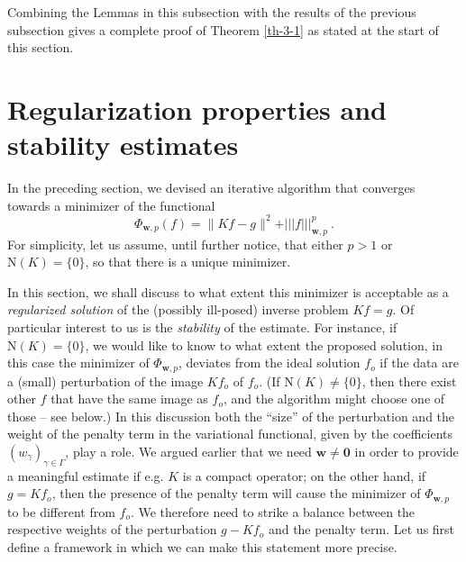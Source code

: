 \documentclass[10pt]{article}
\def\mN{\mbox{N}}
\def\ag{w_{\gamma}}
\def\g{\gamma}
\def\Vvert{\vert\!\vert\!\vert}
\begin{document}
\bigskip

Combining the Lemmas in this subsection with the results of the previous
subsection gives a complete proof of Theorem \ref{th-3-1} as stated at the
start of this section.




\section{Regularization properties and stability estimates}

In the preceding section, we devised
an iterative algorithm that
converges towards a minimizer of the functional
\begin{equation}
\Phi_{\mathbf{w},p}(f) = \| Kf-g\|^2 +  \Vvert f\Vvert^p_{\mathbf{w},p}~.
\label{phimu2}
\end{equation}
For simplicity, let us assume, until further notice,
that either $p>1$ or $\mN(K)=\{0\}$, so that there is a unique minimizer.

In this section, we shall discuss to what extent this minimizer is
acceptable as a {\em regularized solution} of the (possibly ill-posed)
inverse problem $Kf=g$. Of particular interest to us is the {\em stability}
of the estimate. For instance, if $\mN(K)=\{0\}$, we would like to know
 to what extent the proposed solution, in this
case the minimizer of $\Phi_{\mathbf{w},p}$, deviates from the ideal
solution $f_o$ if the data are a (small) perturbation of the image
$Kf_o$ of $f_o$. (If $\mN(K) \neq \{0\}$, then there exist other $f$ that
have the same image as $f_o$, and the algorithm might choose one of those
--  see below.) In this discussion both the ``size'' of the perturbation
and the weight of the penalty term in the variational functional, given
by the coefficients $(\ag)_{\g \in \Gamma}$, play a role. We argued earlier
that we need
$\mathbf{w} \neq \mathbf{0}$ in order to provide a meaningful estimate
if e.g. $K$ is a compact operator; on the other hand,
if $g = Kf_o$, then the presence of the penalty term will cause the
minimizer of $\Phi_{\mathbf{w},p}$ to be different from $f_o$. We therefore
need to strike a balance between the respective weights of the
perturbation $g - Kf_o$ and
the penalty term. Let us first define a framework in which we can make this
statement more precise.
\end{document}
